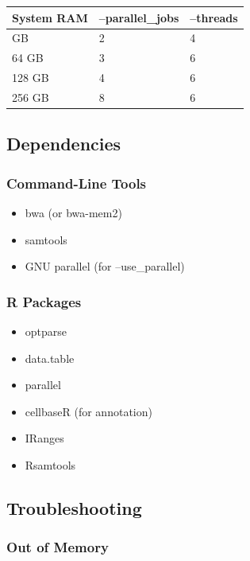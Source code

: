 \documentclass[
]{article}
\newcounter{none} %
\providecommand{\tightlist}{%
  \setlength{\itemsep}{0pt}\setlength{\parskip}{0pt}}
\begin{document}
{\def\LTcaptype{none} %
\begin{longtable}[]{@{}lll@{}}
\toprule\noalign{}
System RAM & --parallel\_jobs & --threads \\
\midrule\noalign{}
\endhead
\bottomrule\noalign{}
\endlastfoot
32 GB & 2 & 4 \\
64 GB & 3 & 6 \\
128 GB & 4 & 6 \\
256 GB & 8 & 6 \\
\end{longtable}
}

\subsection{Dependencies}\label{dependencies}

\subsubsection{Command-Line Tools}\label{command-line-tools}

\begin{itemize}
\tightlist
\item
  bwa (or bwa-mem2)
\item
  samtools
\item
  GNU parallel (for --use\_parallel)
\end{itemize}

\subsubsection{R Packages}\label{r-packages}

\begin{itemize}
\tightlist
\item
  optparse
\item
  data.table
\item
  parallel
\item
  cellbaseR (for annotation)
\item
  IRanges
\item
  Rsamtools
\end{itemize}

\subsection{Troubleshooting}\label{troubleshooting}

\subsubsection{Out of Memory}\label{out-of-memory}
\end{document}
